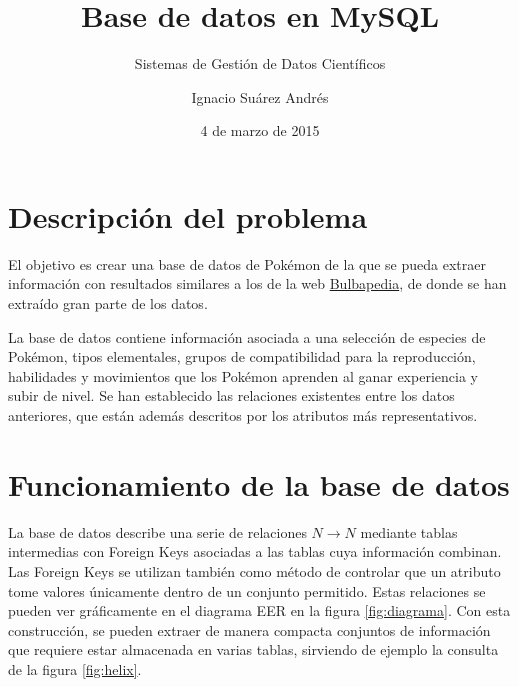 \documentclass{scrartcl}
\title{Base de datos en MySQL}
\subtitle{Sistemas de Gestión de Datos Científicos}
\author{Ignacio Suárez Andrés}
\date{4 de marzo de 2015}
\begin{document}
\maketitle

\section{Descripción del problema}
El objetivo es crear una base de datos de Pokémon de la que se pueda extraer información con resultados similares a los de la web \href{http://bulbapedia.bulbagarden.net/wiki/Main_Page}{Bulbapedia}, de donde se han extraído gran parte de los datos.\par
La base de datos contiene información asociada a una selección de especies de Pokémon, tipos elementales, grupos de compatibilidad para la reproducción, habilidades y movimientos que los Pokémon aprenden al ganar experiencia y subir de nivel. Se han establecido las relaciones existentes entre los datos anteriores, que están además descritos por los atributos más representativos.\par


\section{Funcionamiento de la base de datos}
La base de datos describe una serie de relaciones $N\rightarrow N$ mediante tablas intermedias con Foreign Keys asociadas a las tablas cuya información combinan. Las Foreign Keys se utilizan también como método de controlar que un atributo tome valores únicamente dentro de un conjunto permitido. Estas relaciones se pueden ver gráficamente en el diagrama EER en la figura \ref{fig:diagrama}. Con esta construcción, se pueden extraer de manera compacta conjuntos de información que requiere estar almacenada en varias tablas, sirviendo de ejemplo la consulta de la figura \ref{fig:helix}.\par
\end{document}

